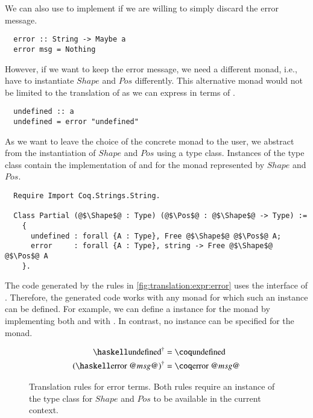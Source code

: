 We can also use  to implement  if we are willing to simply discard the error message.
\begin{verbatim}
  error :: String -> Maybe a
  error msg = Nothing
\end{verbatim}
However, if we want to keep the error message, we need a different monad, i.e., have to instantiate $Shape$ and $Pos$ differently.
This alternative monad would not be limited to the translation of  as we can express  in terms of .
\begin{verbatim}
  undefined :: a
  undefined = error "undefined"
\end{verbatim}

As we want to leave the choice of the concrete monad to the user, we abstract from the instantiation of $Shape$ and $Pos$ using a type class.
Instances of the type class contain the implementation of  and  for the monad represented by $Shape$ and $Pos$.
\begin{verbatim}
  Require Import Coq.Strings.String.

  Class Partial (@$\Shape$@ : Type) (@$\Pos$@ : @$\Shape$@ -> Type) :=
    {
      undefined : forall {A : Type}, Free @$\Shape$@ @$\Pos$@ A;
      error     : forall {A : Type}, string -> Free @$\Shape$@ @$\Pos$@ A
    }.
\end{verbatim}
The code generated by the rules in \autoref{fig:translation:expr:error} uses the interface of .
Therefore, the generated code works with any monad for which such an instance can be defined.
For example, we can define a  instance for the  monad by implementing both  and  with .
In contrast, no  instance can be specified for the  monad.

\begin{figure}[H]
  \begin{align*}
    \toCoq{\haskellM{undefined}}       &= \coqM{undefined} \\
    \toCoq{(\haskellM{error @$msg$@})} &= \coqM{error @$msg$@}
  \end{align*}
  \caption{
    Translation rules for error terms.
    Both rules require an instance of the  type class for $Shape$ and $Pos$ to be available in the current context.
  }
  \label{fig:translation:expr:error}
\end{figure}

